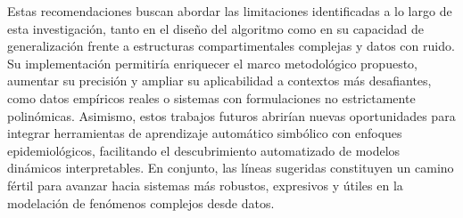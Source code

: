\begin{recomendations}
Estas recomendaciones buscan abordar las limitaciones identificadas a lo largo de esta investigación, tanto en el diseño del algoritmo como en su capacidad de generalización frente a estructuras compartimentales complejas y datos con ruido. Su implementación permitiría enriquecer el marco metodológico propuesto, aumentar su precisión y ampliar su aplicabilidad a contextos más desafiantes, como datos empíricos reales o sistemas con formulaciones no estrictamente polinómicas. Asimismo, estos trabajos futuros abrirían nuevas oportunidades para integrar herramientas de aprendizaje automático simbólico con enfoques epidemiológicos, facilitando el descubrimiento automatizado de modelos dinámicos interpretables. En conjunto, las líneas sugeridas constituyen un camino fértil para avanzar hacia sistemas más robustos, expresivos y útiles en la modelación de fenómenos complejos desde datos.


\end{recomendations}